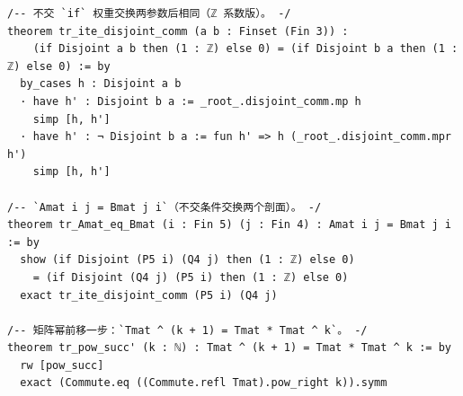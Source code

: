 \documentclass[11pt]{article}
\begin{document}
\begin{lstlisting}
/-- 不交 `if` 权重交换两参数后相同（ℤ 系数版）。 -/
theorem tr_ite_disjoint_comm (a b : Finset (Fin 3)) :
    (if Disjoint a b then (1 : ℤ) else 0) = (if Disjoint b a then (1 : ℤ) else 0) := by
  by_cases h : Disjoint a b
  · have h' : Disjoint b a := _root_.disjoint_comm.mp h
    simp [h, h']
  · have h' : ¬ Disjoint b a := fun h' => h (_root_.disjoint_comm.mpr h')
    simp [h, h']

/-- `Amat i j = Bmat j i`（不交条件交换两个剖面）。 -/
theorem tr_Amat_eq_Bmat (i : Fin 5) (j : Fin 4) : Amat i j = Bmat j i := by
  show (if Disjoint (P5 i) (Q4 j) then (1 : ℤ) else 0)
    = (if Disjoint (Q4 j) (P5 i) then (1 : ℤ) else 0)
  exact tr_ite_disjoint_comm (P5 i) (Q4 j)

/-- 矩阵幂前移一步：`Tmat ^ (k + 1) = Tmat * Tmat ^ k`。 -/
theorem tr_pow_succ' (k : ℕ) : Tmat ^ (k + 1) = Tmat * Tmat ^ k := by
  rw [pow_succ]
  exact (Commute.eq ((Commute.refl Tmat).pow_right k)).symm


\end{lstlisting}
\end{document}
